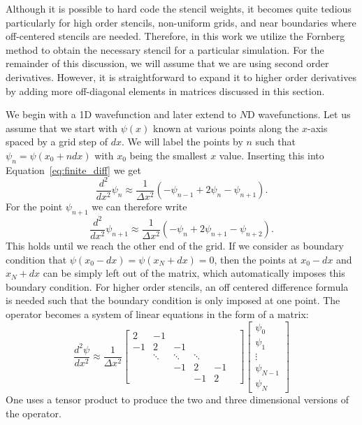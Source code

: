 Although it is possible to hard code the stencil weights, it becomes quite tedious particularly for high order stencils, non-uniform grids, and near boundaries where off-centered stencils are needed. Therefore, in this work we utilize the Fornberg method \cite{Fornberg1988} to obtain the necessary stencil for a particular simulation. For the remainder of this discussion, we will assume that we are using second order derivatives. However, it is straightforward to expand it to higher order derivatives by adding more off-diagonal elements in matrices discussed in this section. 

We begin with a 1D wavefunction and later extend to $N$D wavefunctions. Let us assume that we start with $\psi(x)$ known at various points along the $x$-axis spaced by a grid step of $dx$. We will label the points by $n$ such that $\psi_n = \psi(x_0 + n dx)$ with $x_0$ being the smallest $x$ value. Inserting this into Equation~\ref{eq:finite_diff} we get
\begin{equation}
    \frac{d^2}{dx^2}\psi_n \approx \frac{1}{\Delta x^2}\left(-\psi_{n-1}+2\psi_n-\psi_{n+1} \right).
    \label{eq:finite_diff_second_order}
\end{equation}
For the point $\psi_{n+1}$ we can therefore write
\begin{equation}
    \frac{d^2}{dx^2}\psi_{n+1} \approx \frac{1}{\Delta x^2}\left(-\psi_{n}+2\psi_{n+1}-\psi_{n+2} \right).
    \label{eq:finite_diff_second_order_n+1}
\end{equation}
This holds until we reach the other end of the grid. If we consider as boundary condition that $\psi(x_0-dx)=\psi(x_N+dx)=0$, then the points at $x_0-dx$ and $x_N+dx$ can be simply left out of the matrix, which automatically imposes this boundary condition. For higher order stencils, an off centered difference formula is needed such that the boundary condition is only imposed at one point. The operator becomes a system of linear equations in the form of a matrix:
\begin{equation}
\frac{d^2\psi}{dx^2} \approx
\frac{1}{\Delta x^2}
\begin{bmatrix}
    2 & -1 &  &  &   &  \\
    -1 & 2 & -1 &  &  &  \\
     & \ddots & \ddots & \ddots & \\
     &  & -1 & 2 & -1\\
     &   &  & -1 & 2
\end{bmatrix}
\begin{bmatrix}
    \psi_{0} \\
    \psi_{1} \\
    \vdots  \\
    \psi_{N-1}  \\
    \psi_{N}
\end{bmatrix}
\end{equation}
One uses a tensor product to produce the two and three dimensional versions of the operator.

